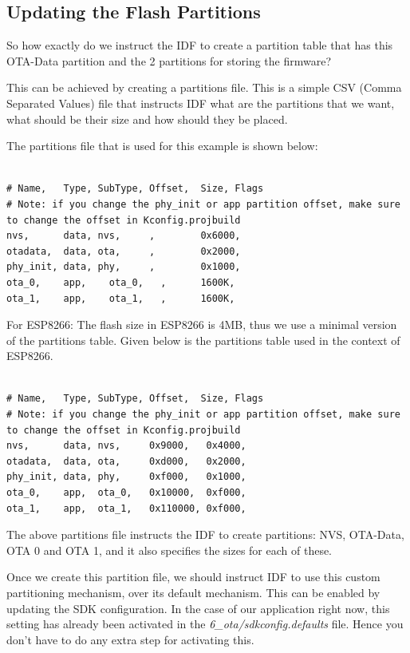 \documentclass[main.tex]{subfiles}
\begin{document}
\subsection{Updating the Flash Partitions}\label{sec:updating_flash_partitions}
So how exactly do we instruct the IDF to create a partition table that has this OTA-Data partition and the 2 partitions for storing the firmware?

This can be achieved by creating a partitions file. This is a simple CSV (Comma Separated Values) file that instructs IDF what are the partitions that we want, what should be their size and how should they be placed.

The partitions file that is used for this example is shown below:
\begin{verbatim}

# Name,   Type, SubType, Offset,  Size, Flags
# Note: if you change the phy_init or app partition offset, make sure to change the offset in Kconfig.projbuild
nvs,      data, nvs,     ,        0x6000,
otadata,  data, ota,     ,        0x2000,
phy_init, data, phy,     ,        0x1000,
ota_0,    app,    ota_0,   ,      1600K,
ota_1,    app,    ota_1,   ,      1600K,
\end{verbatim}

For ESP8266:
The flash size in ESP8266 is 4MB, thus we use a minimal version of the partitions table. Given below is the partitions table used in the context of ESP8266.
\begin{verbatim}

# Name,   Type, SubType, Offset,  Size, Flags
# Note: if you change the phy_init or app partition offset, make sure to change the offset in Kconfig.projbuild
nvs,      data, nvs,     0x9000,   0x4000,
otadata,  data, ota,     0xd000,   0x2000,
phy_init, data, phy,     0xf000,   0x1000,
ota_0,    app,  ota_0,   0x10000,  0xf000,
ota_1,    app,  ota_1,   0x110000, 0xf000,
\end{verbatim}

The above partitions file instructs the IDF to create partitions: NVS, OTA-Data, OTA 0 and OTA 1, and it also specifies the sizes for each of these.

Once we create this partition file, we should instruct IDF to use this custom partitioning mechanism, over its default mechanism. This can be enabled by updating the SDK configuration. In the case of our application right now, this setting has already been activated in the \textit{6\_ota/sdkconfig.defaults} file. Hence you don't have to do any extra step for activating this.
\end{document}
